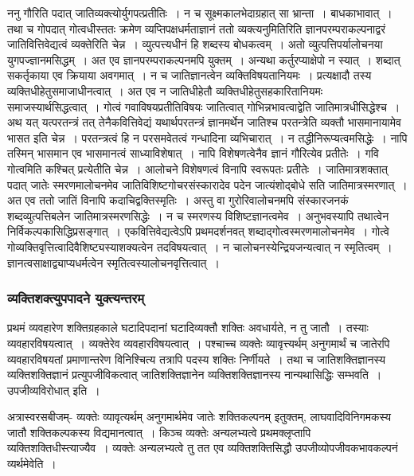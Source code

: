 				\begin{small}

					ननु गौरिति पदात् जातिव्यक्त्योर्युगपत्प्रतीतिः~। न च सूक्ष्मकालभेदाग्रहात् सा भ्रान्ता~। बाधकाभावात्~। तथा च गोपदात् गोत्वधीस्ततः क्रमेण व्यप्तिपक्षधर्मताज्ञानं ततो व्यक्त्यनुमितिरिति ज्ञानपरम्पराकल्पनाद्वरं जातिवित्तिवेद्यत्वं व्यक्तेरिति चेन्न~। व्युत्पत्त्यधीनं हि शब्दस्य बोधकत्वम्~। अतो व्युत्पत्तिपर्यालोचनया युगपज्ज्ञानमसिद्धम्~। अत एव ज्ञानपरम्पराकल्पनमपि युक्तम्~। अन्यथा कर्तुरप्याक्षेपो न स्यात्~। शब्दात् सकर्तृकाया एव क्रियाया अवगमात्~। न च जातिज्ञानत्वेन व्यक्तिविषयतानियमः~। प्रत्यक्षादौ तस्य व्यक्तिधीहेतुसमाजाधीनत्वात्~। अत एव न जातिधीहेतौ व्यक्तिधीहेतुसहकारितानियमः समाजस्यार्थसिद्धत्वात्~। गोत्वं गवाविषयप्रतीतिविषयः जातित्वात् गोभिन्नभावत्वाद्वेति जातिमात्रधीसिद्धेश्च~। अथ यत् यत्परतन्त्रं तत् तेनैकवित्तिवेद्यं यथार्थपरतन्त्रं ज्ञानमर्थेन जातिश्च परतन्त्रेति व्यक्तौ  भासमानायामेव भासत इति चेन्न~। परतन्त्रत्वं हि न परसमवेतत्वं गन्धादिना व्यभिचारात्~। न तद्धीनिरूप्यत्वमसिद्धेः~। नापि तस्मिन् भासमान एव भासमानत्वं साध्याविशेषात्~। नापि विशेषणत्वेनैव ज्ञानं गौरित्येव प्रतीतेः~। गवि गोत्वमिति कश्चित् प्रत्येतीति चेन्न~। आलोचने विशेषणत्वं विनापि स्वरूपतः प्रतीतेः~। जातिमात्रशक्तात् पदात् जातेः स्मरणमालोचनमेव जातिविशिष्टगोचरसंस्कारादेव पदेन जात्यंशोद्बोधे सति जातिमात्रस्मरणात्~। अत एव ततो जातिं विनापि कदाचिद्वक्तिस्मृतिः~। अस्तु वा गुरोरिवालोचनमपि संस्कारजनकं शब्दव्युत्पत्तिबलेन जातिमात्रस्मरणसिद्धेः~। न च स्मरणस्य विशिष्टज्ञानत्वमेव~। अनुभवस्यापि तथात्वेन निर्विकल्पकासिद्धिप्रसङ्गात्~। एकवित्तिवेद्यत्वेऽपि प्रथमदर्शनवत् शब्दाद्गोत्वस्मरणमालोचनमेव~। गोत्वे गोव्यक्तिवृत्तित्वादिवैशिष्ट्यस्याशक्यत्वेन तदविषयत्वात्~। न चालोचनस्येन्द्रियजन्यत्वात् न स्मृतित्वम्~। ज्ञानत्वसाक्षाद्व्याप्यधर्मत्वेन स्मृतित्वस्यालोचनवृत्तित्वात्~। 					 
				\end{small}

			\subsubsection{व्यक्तिशक्त्युपपादने युक्त्यन्तरम्}

				प्रथमं व्यवहारेण शक्तिग्रहकाले घटादिपदानां घटादिव्यक्तौ शक्तिः अवधार्यते, न तु जातौ~। तस्याः व्यवहारविषयत्वात्~। व्यक्तेरेव व्यवहारविषयत्वात्~। पश्चाच्च व्यक्तेः व्यावृत्त्यर्थम् अनुगमार्थं च जातेरपि व्यवहारविषयतां प्रमाणान्तरेण विनिश्चित्य तत्रापि पदस्य शक्तिः निर्णीयते~। तथा च जातिशक्तिज्ञानस्य व्यक्तिशक्तिज्ञानं प्रत्युपजीविकत्वात् जातिशक्तिज्ञानेन व्यक्तिशक्तिज्ञानस्य नान्यथासिद्धिः सम्भवति~। उपजीव्यविरोधात् इति~। 

				अत्रास्वरसबीजम्- व्यक्तेः व्यावृत्यर्थम् अनुगमार्थमेव जातेः शक्तिकल्पनम् इतुक्तम्, लाघवादिविनिगमकस्य जातौ शक्तिकल्पकस्य विद्यमानत्वात्~। किञ्च व्यक्तेः अन्यलभ्यत्वे प्रथमक्लृप्तापि व्यक्तिशक्तिधीस्त्याज्यैव~। व्यक्तेः अन्यलभ्यत्वे तु तत एव व्यक्तिशक्तिसिद्धौ उपजीव्योपजीवकभावकल्पनं व्यर्थमेवेति~। 

